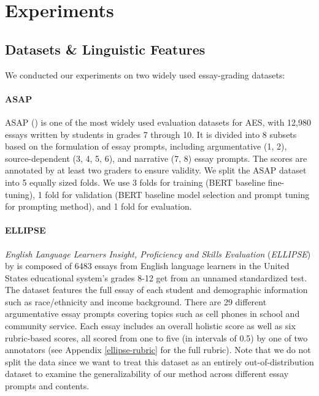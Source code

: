 \section{Experiments}
\label{experiments}
\subsection{Datasets \& Linguistic Features}
\label{dataset-and-evaluation-metrics}
We conducted our experiments on two widely used essay-grading datasets:

\paragraph{ASAP}
\label{asap-and-asap++}
ASAP (\cite{asap-aes}) is one of the most widely used evaluation datasets for AES, with 12,980 essays written by students in grades 7 through 10. It is divided into 8 subsets based on the formulation of essay prompts, including argumentative (1, 2), source-dependent (3, 4, 5, 6), and narrative (7, 8) essay prompts. The scores are annotated by at least two graders to ensure validity. We split the ASAP dataset into 5 equally sized folds. We use 3 folds for training (BERT baseline fine-tuning), 1 fold for validation (BERT baseline model selection and prompt tuning for prompting method), and 1 fold for evaluation.

\paragraph{ELLIPSE}
\label{ellipse}
\textit{English Language Learners Insight, Proficiency and Skills Evaluation} (\textit{ELLIPSE}) by \cite{crossleyEnglishLanguageLearner2024} is composed of 6483 essays from English language learners in the United States educational system's grades 8-12 get from an unnamed standardized test. The dataset features the full essay of each student and demographic information such as race/ethnicity and income background. There are 29 different argumentative essay prompts covering topics such as cell phones in school and community service. Each essay includes an overall holistic score as well as six rubric-based scores, all scored from one to five (in intervals of 0.5) by one of two annotators (see Appendix \ref{ellipse-rubric} for the full rubric). Note that we do not split the data since we want to treat this dataset as an entirely out-of-distribution dataset to examine the generalizability of our method across different essay prompts and contents.

